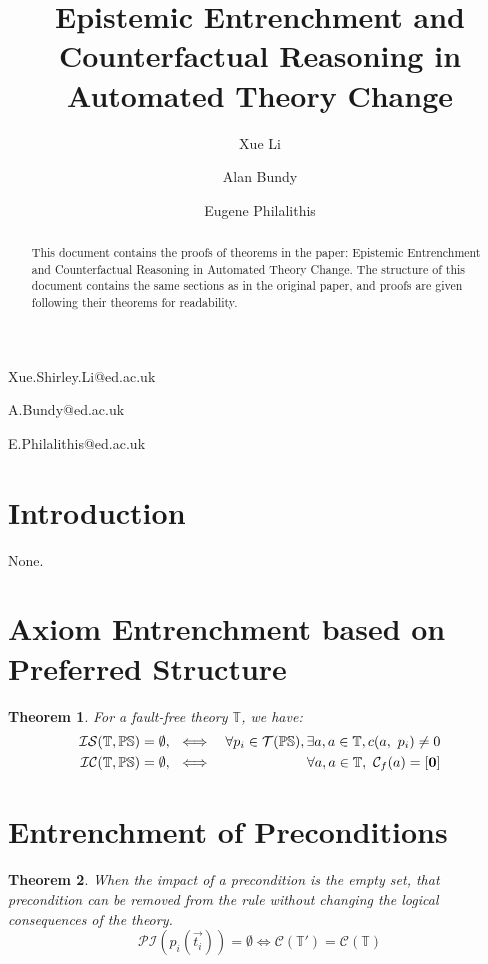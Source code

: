 \documentclass[11pt,letterpaper]{article}
\newtheorem{theorem}{Theorem}[section]
\newcommand{\pf}[1]{\mathcal{#1}(\mathbb{PS})}
\newcommand{\theory}{\mathbb{T}}
\newcommand{\struc}{\mathbb{PS}}
\newcommand{\incompa}{{\cal IC}(\theory,\struc)}
\newcommand{\insuffa}{{\cal IS}(\theory,\struc)}
\begin{document}
 

\title{Epistemic Entrenchment and Counterfactual Reasoning in Automated Theory Change}
 
\author{Xue Li}{Xue.Shirley.Li@ed.ac.uk}
\author{Alan Bundy}{A.Bundy@ed.ac.uk}
\author{Eugene Philalithis}{E.Philalithis@ed.ac.uk}
\address{School of Informatics, University of Edinburgh, UK}
\vskip 0.2in
 
\begin{abstract}
This document contains the proofs of theorems in the paper: Epistemic Entrenchment and Counterfactual Reasoning in Automated Theory Change. The structure of this document contains the same sections as in the original paper, and proofs are given following their theorems for readability.
\end{abstract}

\section{Introduction}
\label{intro}
None.
\section{Axiom Entrenchment based on Preferred Structure}
\label{sec:ee:axiomEntrechment}


\begin{theorem}
For a fault-free theory $\theory$, we have:
\begin{align}
  \insuffa=\emptyset,\ &\iff &\forall p_{i} \in \pf{T}, \exists a, a\in \theory, c(a,\  p_{i}) \neq 0\\ 
  \incompa=\emptyset,\ &\iff& \forall a, a\in \theory,\ \mathcal{C}_{f}(a) = [\textbf{0}]
\end{align}
\end{theorem}

\section{Entrenchment of Preconditions}
\label{sec:ee:preconditions}


\begin{theorem}
When the impact of a precondition is the empty set, that precondition can be removed from the rule without changing the logical consequences of the theory.
\begin{equation}\label{equ:ref:theremPre}
  \mathcal{PI}(p_i(\vec{t_i})) = \emptyset \iff \mathcal{C}(\theory') = \mathcal{C}(\theory) 
\end{equation}
\end{theorem}
\end{document}
